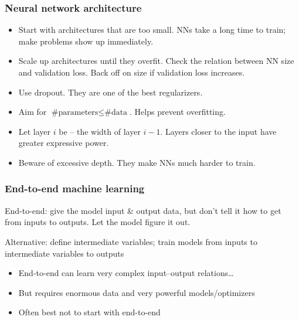 \begin{frame}
    \frametitle{Neural network architecture}
    
    \hfill
    
    \hfill
    
    \hfill
    

    \begin{itemize}[<+->]
        \item \alert{Start with architectures that are too small.}
        NNs take a long time to train; make problems show up immediately.
        \item \alert{Scale up architectures until they overfit.}
        Check the relation between NN size and validation loss.
        Back off on size if validation loss increases.
        \item \alert{Use dropout.}
        They are one of the best regularizers.
        \item \alert{Aim for $\text{\# parameters} \le \text{\# data}$.}
        Helps prevent overfitting.
        \item \alert{Let layer $i$ be -- the width of layer $i - 1$.}
        Layers closer to the input have greater expressive power.
        \item \alert{Beware of excessive depth.}
        They make NNs much harder to train.
    \end{itemize}
\end{frame}

\begin{frame}
    \frametitle{End-to-end machine learning}

    \begin{block}{}
        \alert{End-to-end}: give the model input \& output data, but don't tell it how to get from inputs to outputs.
        Let the model figure it out.
    \end{block}

    \begin{center}
        
    \end{center}
    \pause

    \begin{block}{}
        Alternative: define intermediate variables; train models from inputs to intermediate variables to outputs
    \end{block}

    \begin{center}
        
    \end{center}
    \pause

    \begin{itemize}
        \item End-to-end can learn very complex input--output relations\ldots
        \item But requires enormous data and very powerful models/optimizers
        \item Often best not to start with end-to-end
    \end{itemize}
\end{frame}

